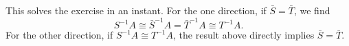 \documentclass[a4paper,11pt]{article}
\begin{document}
\begin{enumerate}
        This solves the exercise in an instant. For the one direction, if
        $\bar S = \bar T$, we find 
        \begin{equation*}
            S^{-1} A \cong \bar S^{-1} A = \bar T^{-1}A \cong T^{-1}A.
        \end{equation*}
        For the other direction, if $S^{-1} A \cong T^{-1} A$, the result above
        directly implies $\bar S = \bar T$. 
\end{enumerate}


\contactend
\end{document}
